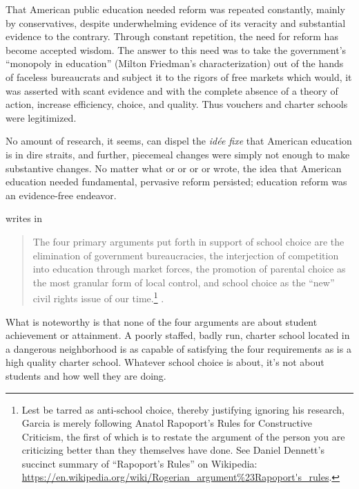 That American public education needed reform was repeated constantly, mainly by conservatives, despite underwhelming evidence of its veracity and substantial evidence to the contrary. Through constant repetition, the need for reform has become accepted wisdom. The answer to this need was to take the government's ``monopoly in education'' (Milton Friedman's characterization) out of the hands of faceless bureaucrats and subject it to the rigors of free markets which would, it was asserted with scant evidence and with the complete absence of a theory of action, increase efficiency, choice, and quality. Thus vouchers and charter schools were legitimized.

No amount of research, it seems, can dispel the \textit{idée fixe} that American education is in dire straits, and further, piecemeal changes were simply not enough to make substantive changes. No matter what \textcite{Henig1994} or \textcite{Berliner.Biddle1997} or \textcite{Nichols.Berliner2007} or \textcite{Glass2008} or \textcite{Berliner.Glass2014} wrote, the idea that American education needed fundamental, pervasive reform persisted; education reform was an evidence-free endeavor.

\citeauthor{Garcia2018} writes in 
\begin{quote}\OnehalfSpacing%
The four primary arguments put forth in support of school choice are the elimination of government bureaucracies, the interjection of competition into education through market forces, the promotion of parental choice as the most granular form of local control, and school choice as the ``new'' civil rights issue of our time.\footnote{Lest \citeauthor{Garcia2018} be tarred as anti-school choice, thereby justifying ignoring his research, Garcia is merely following Anatol Rapoport's Rules for Constructive Criticism, the first of which is to restate the argument of the person you are criticizing better than they themselves have done. See Daniel Dennett's succinct summary of ``Rapoport's Rules''  on Wikipedia: \url{https://en.wikipedia.org/wiki/Rogerian_argument\%23Rapoport's_rules}.} .
\end{quote} What is noteworthy is that none of the four arguments are about student achievement or attainment. A poorly staffed, badly run, charter school located in a dangerous neighborhood is as capable of satisfying the four requirements as is a high quality charter school. Whatever school choice is about, it's not about students and how well they are doing.

